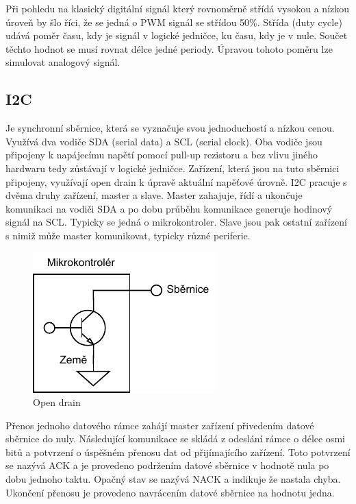 Při pohledu na klasický digitální signál který rovnoměrně střídá vysokou a nízkou úroveň by šlo říci, že se jedná o PWM signál se střídou 50\%. Střída (duty cycle) udává poměr času, kdy je signál v logické jedničce, ku času, kdy je v nule. Součet těchto hodnot se musí rovnat délce jedné periody. Úpravou tohoto poměru lze simulovat analogový signál. \cite{embeded_robotics}

\subsection*{I2C}
Je synchronní sběrnice, která se vyznačuje svou jednoduchostí a nízkou cenou. Využívá dva vodiče SDA (serial data) a SCL (serial clock). Oba vodiče jsou připojeny k napájecímu napětí pomocí pull-up rezistoru a bez vlivu jiného hardwaru tedy zůstávají v logické jedničce. Zařízení, která jsou na tuto sběrnici připojeny, využívají open drain k úpravě aktuální napěťové úrovně. I2C pracuje s dvěma druhy zařízení, master a slave. Master zahajuje, řídí a ukončuje komunikaci na vodiči SDA a po dobu průběhu komunikace generuje hodinový signál na SCL. Typicky se jedná o mikrokontroler. Slave jsou pak ostatní zařízení s nimiž může master komunikovat, typicky různé periferie. \cite{embeded_robotics}

\begin{figure}[h!]
	\centering
	\includegraphics[scale=1]{obrazky-figures/open_drain.pdf}
	\caption{Open drain}
	\label{}
\end{figure}

Přenos jednoho datového rámce zahájí master zařízení přivedením datové sběrnice do nuly. Následující komunikace se skládá z odeslání rámce o délce osmi bitů a potvrzení o úspěšném přenosu dat od přijímajícího zařízení. Toto potvrzení se nazývá ACK a je provedeno podržením datové sběrnice v hodnotě nula po dobu jednoho taktu. Opačný stav se nazývá NACK a indikuje že nastala chyba. Ukončení přenosu je provedeno navrácením datové sběrnice na hodnotu jedna. \cite{um10204}

